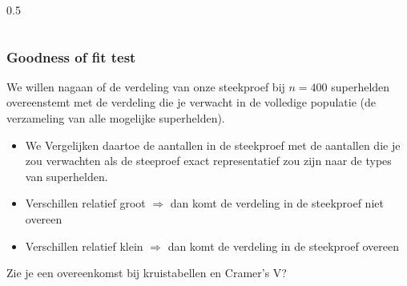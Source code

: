 \documentclass{beamer}
\begin{document}
\begin{frame}
\begin{columns}
\begin{column} {0.5\textwidth}
    \end{column}
  \end{columns}
\end{frame}

\begin{frame}
  \frametitle{Goodness of fit test}
   We willen  nagaan of de verdeling van onze steekproef bij $n = 400$ superhelden overeenstemt met de verdeling die je verwacht in de volledige populatie (de verzameling van alle mogelijke superhelden).


  \begin{itemize}
    \item We Vergelijken daartoe de aantallen in de steekproef met de aantallen die je zou verwachten als de steeproef exact representatief zou zijn naar de types van superhelden.
    \item Verschillen relatief groot $\Rightarrow$ dan komt de verdeling in de steekproef niet overeen
    \item Verschillen relatief klein $\Rightarrow$ dan komt de verdeling in de steekproef overeen
  \end{itemize}

  \pause
  Zie je een overeenkomst bij kruistabellen en Cramer's V?
\end{frame}
\end{document}
